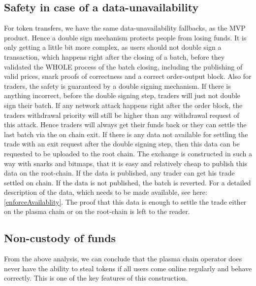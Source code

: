 \documentclass[11pt,parskip=full]{scrartcl}%
\begin{document}
\subsection{Safety in case of a data-unavailability}
For token transfers, we have the same data-unavailability fallbacks, as the MVP product. 
Hence a double sign mechanism protects people from losing funds. 
It is only getting a little bit more complex, as users should not double sign a transaction, which happens right after the closing of a batch, before they validated the WHOLE process of the batch closing, including the publishing of valid prices, snark proofs of correctness and a correct order-output block. \newline
Also for traders, the safety is guaranteed by a  double signing mechanism. 
If there is anything incorrect, before the double signing step, traders will just not double sign their batch. 
If any network attack happens right after the order block, the traders withdrawal priority will still be higher than any withdrawal request of this attack. Hence traders will always get their funds back or they can settle the last batch via the on chain exit. 
If there is any data not available for settling the trade with an exit request after the double signing step, then this data can be requested to be uploaded to the root chain. 
The exchange is constructed in such a way with snarks and bitmaps, that it is easy and relatively cheap to publish this data on the root-chain. 
If the data is published, any trader can get his trade settled on chain. If the data is not published, the batch is reverted. 
For a detailed description of the data, which needs to be made available, see here: \ref{enforceAvailablity}. 
The proof that this data is enough to settle the trade either on the plasma chain or on the root-chain is left to the reader. 

\subsection{Non-custody of funds}
From the above analysis, we can conclude that the plasma chain operator does never have the ability to steal tokens if all users come online regularly and behave correctly. 
This is one of the key features of this construction. 
\end{document}
